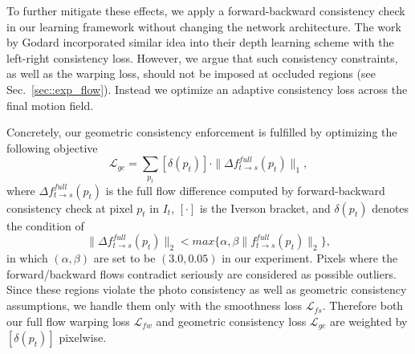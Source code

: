 \documentclass[10pt,twocolumn,letterpaper]{article}
\begin{document}
To further mitigate these effects, %
we apply a forward-backward consistency check in our learning framework without changing the network architecture. The work by Godard \etal\cite{monodepth17} incorporated similar idea into their depth learning scheme %
with the left-right consistency loss. However, we argue that such consistency constraints, as well as the warping loss, should not be imposed at occluded regions (see Sec.~\ref{sec::exp_flow}). Instead we optimize an adaptive consistency loss across the final motion field.
 
Concretely, our geometric consistency enforcement is fulfilled by optimizing the following objective
\begin{equation}
    \label{equa::cst}
\mathcal{L}_{gc} = \sum_{p_t} [\delta(p_t)]\cdot\|\Delta f_{t\to s}^{full}(p_t)\|_1, 
\end{equation}
where $\Delta f_{t\to s}^{full}(p_t)$ is the full flow difference computed by forward-backward consistency check at pixel $p_t$ in $I_t$, $[\cdot]$ is the Iverson bracket, and $\delta(p_t)$ denotes the condition of  
\begin{equation}
\|\Delta f_{t\to s}^{full}(p_t)\|_2<max\{\alpha, \beta\|f_{t\to s}^{full}(p_t)\|_2\},
\end{equation}
in which $(\alpha,\beta)$ are set to be $(3.0,0.05)$ in our experiment. 
Pixels where the forward/backward flows contradict seriously are considered as possible outliers. Since these regions violate the photo consistency as well as geometric consistency assumptions, we handle them only with the smoothness loss $\mathcal{L}_{fs}$. 
Therefore both our full flow warping loss $\mathcal{L}_{fw}$ and geometric consistency loss $\mathcal{L}_{gc}$ are weighted by $[\delta(p_t)]$ pixelwise.
\end{document}
